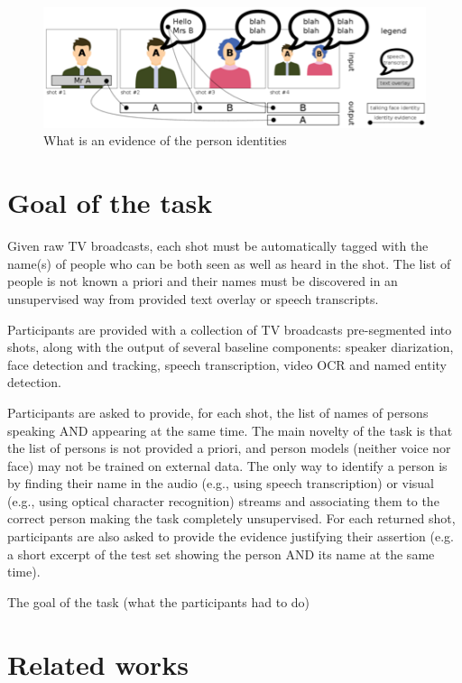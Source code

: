 \documentclass{acm_proc_article-me}
\begin{document}
\begin{figure}[t]
 \center 
 \includegraphics[width=0.7\linewidth]{figs/evidence.png}
 \centering
 \caption {What is an evidence of the person identities}
 \label{fig:evidence}
\end{figure}

\section{Goal of the task}

Given raw TV broadcasts, each shot must be automatically tagged with the name(s) of people who can be both seen as well as heard in the shot. The list of people is not known a priori and their names must be discovered in an unsupervised way from provided text overlay or speech transcripts. 

Participants are provided with a collection of TV broadcasts pre-segmented into shots, along with the output of several baseline components: speaker diarization, face detection and tracking, speech transcription, video OCR and named entity detection. 

Participants are asked to provide, for each shot, the list of names of persons speaking AND appearing at the same time. The main novelty of the task is that the list of persons is not provided a priori, and person models (neither voice nor face) may not be trained on external data. The only way to identify a person is by finding their name in the audio (e.g., using speech transcription) or visual (e.g., using optical character recognition) streams and associating them to the correct person making the task completely unsupervised. For each returned shot, participants are also asked to provide the evidence justifying their assertion (e.g. a short excerpt of the test set showing the person AND its name at the same time).



The goal of the task (what the participants had to do)

\section{Related works}
\end{document}
